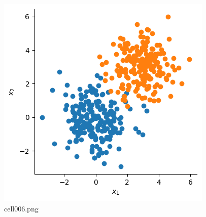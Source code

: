 \begin{figure}[ht]
	\centering
	\includegraphics[scale=0.8, max width=\linewidth]{./fig/local-learning-rule/logistic-regression-perceptron/cell006.png}
	\caption{cell006.png}
	\label{cell006.png}
\end{figure}